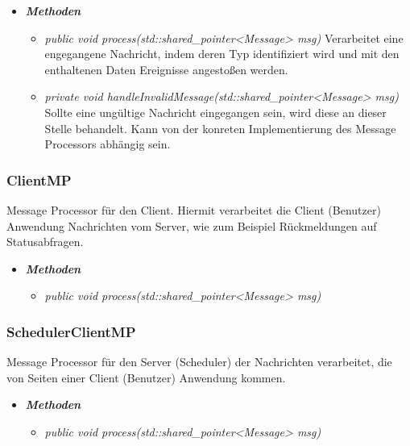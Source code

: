 \documentclass[a4paper,12pt]{article}
\begin{document}
	\begin{itemize}[label={}]

	\item\textit{\textbf{Methoden}}
		\begin{itemize}[label={\textbullet}]
			\item\textit{public void process(std::shared\_pointer<Message> msg)} Verarbeitet eine engegangene Nachricht, indem deren Typ identifiziert wird und mit den enthaltenen Daten Ereignisse angestoßen werden.
			\item\textit{private void handleInvalidMessage(std::shared\_pointer<Message> msg)} Sollte eine ungültige Nachricht eingegangen sein, wird diese an dieser Stelle behandelt. Kann von der konreten Implementierung des Message Processors abhängig sein.

		\end{itemize}

\end{itemize}


\subsubsection{ClientMP}

Message Processor für den Client. Hiermit verarbeitet die Client (Benutzer) Anwendung Nachrichten vom Server, wie zum Beispiel Rückmeldungen auf Statusabfragen.

	\begin{itemize}[label={}]

	\item\textit{\textbf{Methoden}}
		\begin{itemize}[label={\textbullet}]
			\item\textit{public void process(std::shared\_pointer<Message> msg)}

		\end{itemize}

\end{itemize}


\subsubsection{SchedulerClientMP}

Message Processor für den Server (Scheduler) der Nachrichten verarbeitet, die von Seiten einer Client (Benutzer) Anwendung kommen.

	\begin{itemize}[label={}]

	\item\textit{\textbf{Methoden}}
		\begin{itemize}[label={\textbullet}]
			\item\textit{public void process(std::shared\_pointer<Message> msg)}

		\end{itemize}

\end{itemize}
\end{document}
